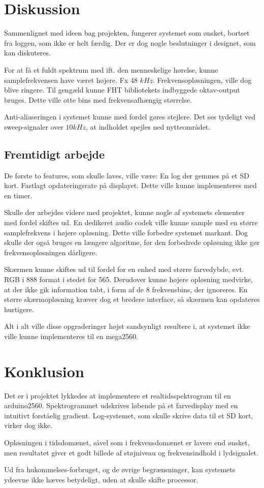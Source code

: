 \section{Diskussion}
Sammenlignet med ideen bag projekten, fungerer systemet som ønsket, bortset fra loggen, som ikke er helt færdig. 
Der er dog nogle beslutninger i designet, som kan diskuteres. 

For at få et fuldt spektrum med ift. den menneskelige hørelse, kunne samplefrekvensen have været højere. 
Fx 48 $kHz$. 
Frekvensopløsningen, ville dog blive ringere. Til gengæld kunne FHT bibliotekets indbyggede oktav-output bruges. Dette ville otte bins med frekvensafhængig størrelse.

Anti-aliaseringen i systemet kunne med fordel gøres stejlere. Det ses tydeligt ved sweep-signaler over $10 kHz$, at indholdet spejles ned nytteområdet. 

\subsection{Fremtidigt arbejde}
De første to features, som skulle laves, ville være:
En log der gemmes på et SD kort.
Fastlagt opdateringsrate på displayet. Dette ville kunne implementeres med en timer. 

Skulle der arbejdes videre med projektet, kunne nogle af systemets elementer med fordel skiftes ud. 
En dedikeret audio codek ville kunne sample med en større samplefrekvens i højere opløsning. 
Dette ville forbedre systemet markant. 
Dog skulle der også bruges en længere algoritme, før den forbedrede opløsning ikke gør frekvensopløsningen dårligere.

Skærmen kunne skiftes ud til fordel for en enhed med større farvedybde, evt. RGB i 888 format i stedet for 565. 
Derudover kunne højere opløsning medvirke, at der ikke gik information tabt, i form af de 8 frekvensbins, der ignoreres. 
En større skærmopløsning kræver dog et bredere interface, så skærmen kan opdateres hurtigere. 

Alt i alt ville disse opgraderinger højst sandsynligt resultere i, at systemet ikke ville kunne implementeres til en mega2560.

\section{Konklusion}
Det er i projektet lykkedes at implementere et realtidsspektrogram til en arduino2560. 
Spektrogrammet udskrives løbende på et farvedisplay med en intuitivt forståelig gradient.  
Log-systemet, som skulle skrive data til et SD kort, virker dog ikke. 

Opløsningen i tidsdomænet, såvel som i frekvensdomænet er lavere end ønsket, men resultatet giver et godt billede af støjniveau og frekvensindhold i lydsignalet. 

Ud fra hukommelses-forbruget, og de øvrige begrænsninger, kan systemets ydeevne ikke hæves betydeligt, uden at skulle skifte processor. 
 
